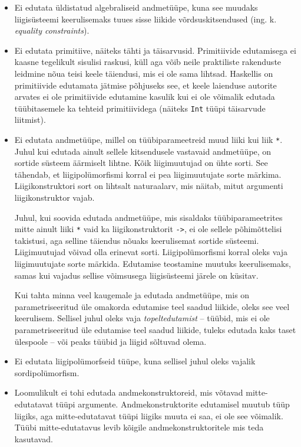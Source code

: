 \documentclass[12pt]{article}
\begin{document}
        \begin{itemize}
          \item
            Ei edutata üldistatud algebraliseid andmetüüpe, kuna see muudaks liigisüsteemi keerulisemaks tuues sisse liikide võrdsuskitsendused (ing. k. \textit{equality constraints}).
          \item
            Ei edutata primitiive, näiteks tähti ja täisarvusid. Primitiivide edutamisega ei kaasne tegelikult sisulisi raskusi, küll aga võib neile praktiliste rakenduste leidmine nõua teisi keele täiendusi, mis ei ole sama lihtsad. Haskellis on primitiivide edutamata jätmise põhjuseks see, et keele laienduse autorite arvates ei ole primitiivide edutamine kasulik kui ei ole võimalik edutada tüübitasemele ka tehteid primitiividega (näiteks \verb!Int! tüüpi täisarvude liitmist).
          \item
            Ei edutata andmetüüpe, millel on tüübiparameetreid muud liiki kui liik \verb!*!. Juhul kui edutada ainult sellele kitsendusele vastavaid andmetüüpe, on sortide süsteem äärmiselt lihtne. Kõik liigimuutujad on ühte sorti. See tähendab, et liigipolümorfismi korral ei pea liigimuutujate sorte märkima. Liigikonstruktori sort on lihtsalt naturaalarv, mis näitab, mitut argumenti liigikonstruktor vajab.

            Juhul, kui soovida edutada andmetüüpe, mis sisaldaks tüübiparameetrites mitte ainult liiki \verb!*! vaid ka liigikonstruktorit \verb!->!, ei ole sellele põhimõttelisi takistusi, aga selline täiendus nõuaks keerulisemat sortide süsteemi. Liigimuutujad võivad olla erinevat sorti. Liigipolümorfismi korral oleks vaja liigimuutujate sorte märkida. Edutamise teostamine muutuks keerulisemaks, samas kui vajadus sellise võimsusega liigisüsteemi järele on küsitav.

            Kui tahta minna veel kaugemale ja edutada andmetüüpe, mis on parametriseeritud üle omakorda edutamise teel saadud liikide, oleks see veel keerulisem. Sellisel juhul oleks vaja \textit{topeltedutamist} -- tüübid, mis ei ole parametriseeritud üle edutamise teel saadud liikide, tuleks edutada kaks taset ülespoole -- või peaks tüübid ja liigid sõltuvad olema.
          \item
            Ei edutata liigipolümorfseid tüüpe, kuna sellisel juhul oleks vajalik sordipolümorfism.
          \item
            Loomulikult ei tohi edutada andmekonstruktoreid, mis võtavad mitte-edutatavat tüüpi argumente. Andmekonstruktorite edutamisel muutub tüüp liigiks, aga mitte-edutatavat tüüpi liigiks muuta ei saa, ei ole see võimalik. Tüübi mitte-edutatavus levib kõigile andmekonstruktoritele mis teda kasutavad.
        \end{itemize}
\end{document}
